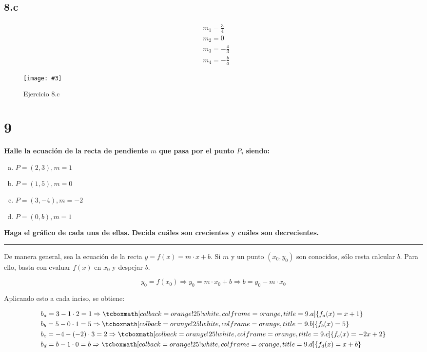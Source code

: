 \documentclass{article}
\newcommand{\hresult}[2]{\tcboxmath[colback=orange!25!white,colframe=orange, title=#1] {#2} }
\newcommand{\figurex}[4]{\begin{figure}[ht] \caption{#1} \texttt{[image: \#3]} \centering \label{#4}\end{figure}}
\newcommand{\sectionx}[1]{\section*{#1}\label{sec:#1}\addcontentsline{toc}{section}{\nameref{sec:#1}}}
\begin{document}
\subsection*{8.c}
\label{subsec:8.c}

\begin{subequations}
\begin{align}
& m_1 = \frac{3}{4} \\
& m_2 = 0 \\
& m_3 = -\frac{4}{3} \\
& m_4 = -\frac{b}{a}
\end{align}
\end{subequations}

\newpage

\figurex{Ejercicio 8.c}{2.5}{../img/guide_01/ex_08c.png}{fig:8c}

\sectionx{9}

\textbf{Halle la ecuación de la recta de pendiente $m$ que pasa por el punto $P$, siendo:}

\begin{enumerate}[(a)]

\bfseries

\item $P = (2, 3), m = 1$

\item $P = (1, 5), m = 0$

\item $P = (3, -4), m = -2$

\item $P = (0, b), m = 1$

\end{enumerate}

\textbf{Haga el gráfico de cada una de ellas. Decida cuáles son crecientes y cuáles son decrecientes.}
\vspace{1em}
\hrule
\vspace{1em}
De manera general, sea la ecuación de la recta $y = f(x) = m \cdot x + b$. Si $m$ y un punto $(x_0, y_0)$ son conocidos, sólo resta calcular $b$. Para ello, basta con evaluar $f(x)$ en $x_0$ y despejar $b$.

\begin{equation}
y_0 = f(x_0) \Rightarrow y_0 = m \cdot x_0 + b \Rightarrow b = y_0 - m \cdot x_0
\end{equation}

Aplicando esto a cada inciso, se obtiene:

\begin{subequations}
\begin{align}
& b_a = 3 - 1 \cdot 2 = 1 \Rightarrow \hresult{9.a}{ f_a(x) = x + 1 } \\
& b_b = 5 - 0 \cdot 1 = 5 \Rightarrow \hresult{9.b}{ f_b(x) = 5 } \\
& b_c = -4 - (-2) \cdot 3 = 2 \Rightarrow \hresult{9.c}{ f_c(x) = -2x + 2 } \\
& b_d = b - 1 \cdot 0 = b \Rightarrow \hresult{9.d}{ f_d(x) = x + b }
\end{align}
\end{subequations}
\end{document}
